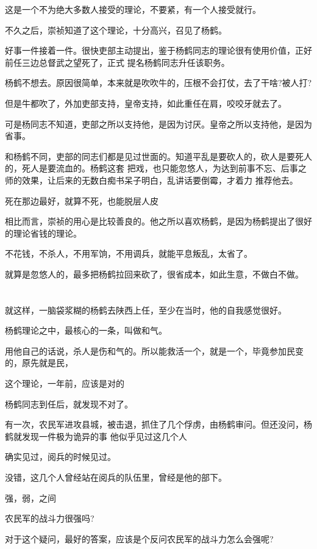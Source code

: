 \documentclass[11pt,a4paper,onecolumn]{article}
\begin{document}
这是一个不为绝大多数人接受的理论，不要紧，有一个人接受就行。

不久之后，崇祯知道了这个理论，十分高兴，召见了杨鹤。

好事一件接着一件。很快吏部主动提出，鉴于杨鹤同志的理论很有使用价值，正好前任三边总督武之望死了，正式
提名杨鹤同志升任该职务。

杨鹤不想去。原因很简单，本来就是吹吹牛的，压根不会打仗，去了干啥?被人打?

但是牛都吹了，外加吏部支持，皇帝支持，如此重任在肩，咬咬牙就去了。

可是杨同志不知道，吏部之所以支持他，是因为讨厌。皇帝之所以支持他，是因为省事。

和杨鹤不同，吏部的同志们都是见过世面的。知道平乱是要砍人的，砍人是要死人的，死人是要流血的。杨鹤这套
把戏，也只能忽悠人，为达到前事不忘、后事之师的效果，让后来的无数白痴书呆子明白，乱讲话要倒霉，才着力
推荐他去。

死在那边最好，就算不死，也能脱层人皮

相比而言，崇祯的用心是比较善良的。他之所以喜欢杨鹤，是因为杨鹤提出了很好的理论\myrule 省钱的理论。

不花钱，不杀人，不用军饷，不用调兵，就能平息叛乱，太省了。

就算是忽悠人的，最多把杨鹤拉回来砍了，很省成本，如此生意，不做白不做。

\section[\thesection]{}

就这样，一脑袋浆糊的杨鹤去陕西上任，至少在当时，他的自我感觉很好。

杨鹤理论之中，最核心的一条，叫做和气。

用他自己的话说，杀人是伤和气的。所以能救活一个，就是一个，毕竟参加民变的，原先就是民，

这个理论，一年前，应该是对的

杨鹤同志到任后，就发现不对了。

有一次，农民军进攻县城，被击退，抓住了几个俘虏，由杨鹤审问。但还没问，杨鹤就发现一件极为诡异的事\myrule 
他似乎见过这几个人

确实见过，阅兵的时候见过。

没错，这几个人曾经站在阅兵的队伍里，曾经是他的部下。

强，弱，之间

农民军的战斗力很强吗?

对于这个疑问，最好的答案，应该是个反问\myrule 农民军的战斗力怎么会强呢?
\end{document}
